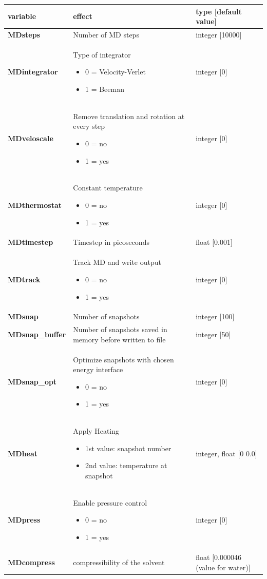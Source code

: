 \documentclass[10pt,a4paper]{article} %
\begin{document}
	\begin{tabularx}{\textwidth}{l|X|X}
		variable & effect & type [default value] \\
		\hline
		\textbf{MDsteps} & Number of MD steps & integer [10000] \\
		\textbf{MDintegrator} & Type of integrator \begin{itemize}
			\item 0  = Velocity-Verlet \item 1 = Beeman
			\end{itemize} 	
		& integer [0] \\
		\textbf{MDveloscale} & Remove translation and rotation at every step\begin{itemize} \item 0 = no \item 1 = yes\end{itemize}& integer [0] \\
		\textbf{MDthermostat} & Constant temperature\begin{itemize} \item 0 = no \item 1 = yes\end{itemize}
		 & integer [0] \\
		\textbf{MDtimestep} & Timestep in picoseconds & float [0.001] \\
		\textbf{MDtrack} & Track MD and write output\begin{itemize} \item 0 = no \item 1 = yes\end{itemize}& integer [0] \\
		\textbf{MDsnap} & Number of snapshots & integer [100] \\
		\textbf{MDsnap\_buffer} & Number of snapshots saved in memory before written to file & integer [50] \\
		\textbf{MDsnap\_opt} & Optimize snapshots with chosen energy interface\begin{itemize} \item 0 = no \item 1 = yes\end{itemize} & integer [0] \\
		\textbf{MDheat}  & Apply Heating \begin{itemize}\item1st value: snapshot number\item2nd value: temperature at snapshot\end{itemize} & integer, float [0 0.0]\\
		\textbf{MDpress} & Enable pressure control\begin{itemize} \item 0 = no \item 1 = yes\end{itemize}& integer [0]\\
		\textbf{MDcompress} & compressibility of the solvent & float [0.000046 (value for water)] 
	\end{tabularx} ~\\ 
	
\end{document}
